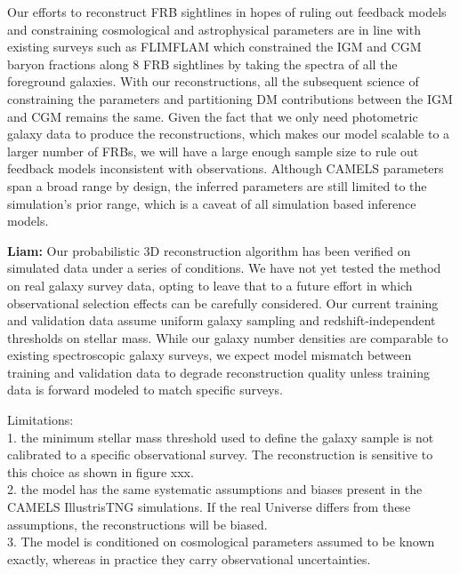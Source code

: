 \documentclass[twocolumn]{aastex631}
\begin{document}
Our efforts to reconstruct FRB sightlines in hopes of ruling out feedback models and constraining cosmological and astrophysical parameters are in line with existing surveys such as FLIMFLAM \citep{Khrykin_2024} which constrained the IGM and CGM baryon fractions along 8 FRB sightlines by taking the spectra of all the foreground galaxies. With our reconstructions, all the subsequent science of constraining the parameters and partitioning DM contributions between the IGM and CGM remains the same.  Given the fact that we only need photometric galaxy data to produce the reconstructions, which makes our model scalable to a larger number of FRBs, we will have a large enough sample size to rule out feedback models inconsistent with observations. Although CAMELS parameters span a broad range by design, the inferred parameters are still limited to the simulation's prior range, which is a caveat of all simulation based inference models. 

\textbf{Liam:} Our 
probabilistic 3D reconstruction algorithm has been 
verified on simulated data under a series of conditions. We 
have not yet tested the method on real galaxy 
survey data, opting to leave that to a future effort in which 
observational selection effects can be carefully considered. 
Our current training and validation data assume uniform 
galaxy sampling and redshift-independent thresholds on stellar mass. While our galaxy number densities are comparable to 
existing spectroscopic galaxy surveys, we expect model 
mismatch between training and validation data to degrade 
reconstruction quality unless training data is forward modeled 
to match specific surveys. 

Limitations: \\
1. the minimum stellar mass threshold used to define the galaxy sample is not calibrated to a specific observational survey. The reconstruction is sensitive to this choice as shown in figure xxx.\\
2. the model has the same systematic assumptions and biases present in the CAMELS IllustrisTNG simulations. If the real Universe differs from these assumptions, the reconstructions will be biased. \\
3. The model is conditioned on cosmological parameters assumed to be known exactly, whereas in practice they carry observational uncertainties. \\
\end{document}
